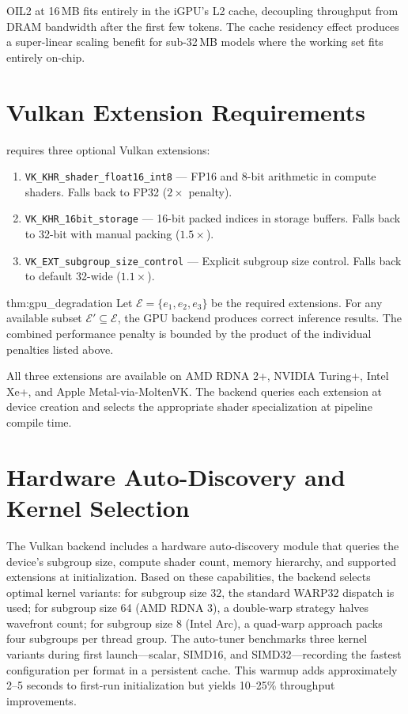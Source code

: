 OIL2 at 16\,MB fits entirely in the iGPU's L2 cache, decoupling throughput from
DRAM bandwidth after the first few tokens. The cache residency effect produces a
super-linear scaling benefit for sub-32\,MB models where the working set fits
entirely on-chip.

\section{Vulkan Extension Requirements}
\label{sec:vulkan_ext}

\MYTHOS{} requires three optional Vulkan extensions:

\begin{enumerate}
    \item \texttt{VK\_KHR\_shader\_float16\_int8} --- FP16 and 8-bit arithmetic
          in compute shaders. Falls back to FP32 ($2\times$ penalty).
    \item \texttt{VK\_KHR\_16bit\_storage} --- 16-bit packed indices in storage
          buffers. Falls back to 32-bit with manual packing ($1.5\times$).
    \item \texttt{VK\_EXT\_subgroup\_size\_control} --- Explicit subgroup size
          control. Falls back to default 32-wide ($1.1\times$).
\end{enumerate}

\begin{mythm}{thm:gpu_degradation}
Let $\mathcal{E} = \{e_1, e_2, e_3\}$ be the required extensions. For any
available subset $\mathcal{E}' \subseteq \mathcal{E}$, the GPU backend produces
correct inference results. The combined performance penalty is bounded by the
product of the individual penalties listed above.
\end{mythm}

All three extensions are available on AMD RDNA 2+, NVIDIA Turing+, Intel Xe+,
and Apple Metal-via-MoltenVK. The backend queries each extension at device
creation and selects the appropriate shader specialization at pipeline compile
time.

\section{Hardware Auto-Discovery and Kernel Selection}
\label{sec:gpu_autotune}

The Vulkan backend includes a hardware auto-discovery module that queries the device's subgroup size, compute shader count, memory hierarchy, and supported extensions at initialization. Based on these capabilities, the backend selects optimal kernel variants: for subgroup size 32, the standard WARP32 dispatch is used; for subgroup size 64 (AMD RDNA 3), a double-warp strategy halves wavefront count; for subgroup size 8 (Intel Arc), a quad-warp approach packs four subgroups per thread group. The auto-tuner benchmarks three kernel variants during first launch---scalar, SIMD16, and SIMD32---recording the fastest configuration per format in a persistent cache. This warmup adds approximately 2--5 seconds to first-run initialization but yields 10--25\% throughput improvements.

